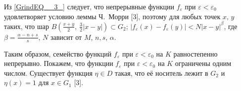 Из \ref{GrindEQ__3_} следует, что непрерывные функции $f_{\varepsilon }$ при $\varepsilon <{\varepsilon }_0$ удовлетворяет условию леммы Ч.~Морри [3],
поэтому для любых точек $x$, $y$ таких, что шар $B\left(\frac{x+y}{2}, \ \frac{3}{2} \left|x-y\right|\right)\subset G_{2}$; $\left|f_{\varepsilon } \left(x\right)-f_{\varepsilon } \left(y\right)\right|<N\left|x-y\right|^{\beta } $,
где $\beta =\frac{\alpha -n+s}{s}$, $N$ зависит от $M$, $n, s$, $\alpha$.

Таким образом, семейство функций $f_{\varepsilon }$ при $\varepsilon <{\varepsilon }_0$ на $K$ равностепенно непрерывно. Покажем, что функции $f_{\varepsilon }$ при $\varepsilon <{\varepsilon }_0$ на $K$ ограничены одним числом.
Существует функция $\eta \in D$ такая, что её носитель лежит в $G_2$ и $\eta \left(x\right)=1$ для $x\in G_1$ [3].

